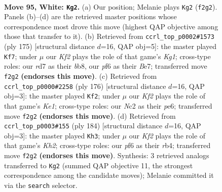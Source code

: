 \documentclass[11pt]{article}
\begin{document}
\clearpage

\begin{figure}[p]\centering
\begin{subfigure}{0.46\textwidth}\centering
\resizebox{\linewidth}{!}{%
\newchessgame
\chessboard[
  setfen={6k1/3r2p1/5p2/7p/7P/6P1/1RN2K2/8 w - - 14 95},
  showmover=false,
  pgfstyle=straightmove, color=movearrow, markmove={f2-g2}
]}
\caption{}
\end{subfigure}\hfill
\begin{subfigure}{0.46\textwidth}\centering
\resizebox{\linewidth}{!}{%
\newchessgame
\chessboard[
  setfen={1B4k1/4b1p1/7p/5p1P/8/6PK/5P2/8 b - - 1 88},
  showmover=false,
  pgfstyle=straightmove, color=movearrow, markmove={g8-f7}
]}
\caption{}
\end{subfigure}
\\[4pt]
\begin{subfigure}{0.46\textwidth}\centering
\resizebox{\linewidth}{!}{%
\newchessgame
\chessboard[
  setfen={3R4/8/2r1pk2/6p1/5pP1/5P2/4P3/4K3 w - - 78 89},
  showmover=false,
  pgfstyle=straightmove, color=movearrow, markmove={e1-f2}
]}
\caption{}
\end{subfigure}\hfill
\begin{subfigure}{0.46\textwidth}\centering
\resizebox{\linewidth}{!}{%
\newchessgame
\chessboard[
  setfen={2R5/8/8/7k/1r3p1p/5P2/6PK/8 w - - 0 93},
  showmover=false,
  pgfstyle=straightmove, color=movearrow, markmove={h2-h3}
]}
\caption{}
\end{subfigure}
\caption{\textbf{Move 95, White: \texttt{Kg2}.} (a) Our position; Melanie plays \texttt{Kg2} (\texttt{f2g2}). Panels (b)--(d) are the retrieved master positions whose correspondence most drove this move (highest QAP objective among those that transfer to it). (b) Retrieved from \texttt{ccrl\_top\_p0002\#1573} (ply 175) [structural distance $d$=16, QAP obj=5]: the master played \texttt{Kf7}; under $\mu$ our \emph{Kf2} plays the role of that game's \emph{Kg1}; cross-type roles: our \emph{r}d7 as their \emph{b}b8, our \emph{p}f6 as their \emph{B}e7; transferred move \texttt{f2g2} \textbf{(endorses this move)}. (c) Retrieved from \texttt{ccrl\_top\_p0000\#2258} (ply 176) [structural distance $d$=16, QAP obj=3]: the master played \texttt{Kf2}; under $\mu$ our \emph{Kf2} plays the role of that game's \emph{Ke1}; cross-type roles: our \emph{N}c2 as their \emph{p}e6; transferred move \texttt{f2g2} \textbf{(endorses this move)}. (d) Retrieved from \texttt{ccrl\_top\_p0003\#155} (ply 184) [structural distance $d$=16, QAP obj=3]: the master played \texttt{Kh3}; under $\mu$ our \emph{Kf2} plays the role of that game's \emph{Kh2}; cross-type roles: our \emph{p}f6 as their \emph{r}b4; transferred move \texttt{f2g2} \textbf{(endorses this move)}. Synthesis: 3 retrieved analogs transferred to \texttt{Kg2} (summed QAP objective 11, the strongest correspondence among the candidate moves); Melanie committed it via the \texttt{search} selector.}
\label{fig:thought-m188}
\end{figure}
\end{document}

